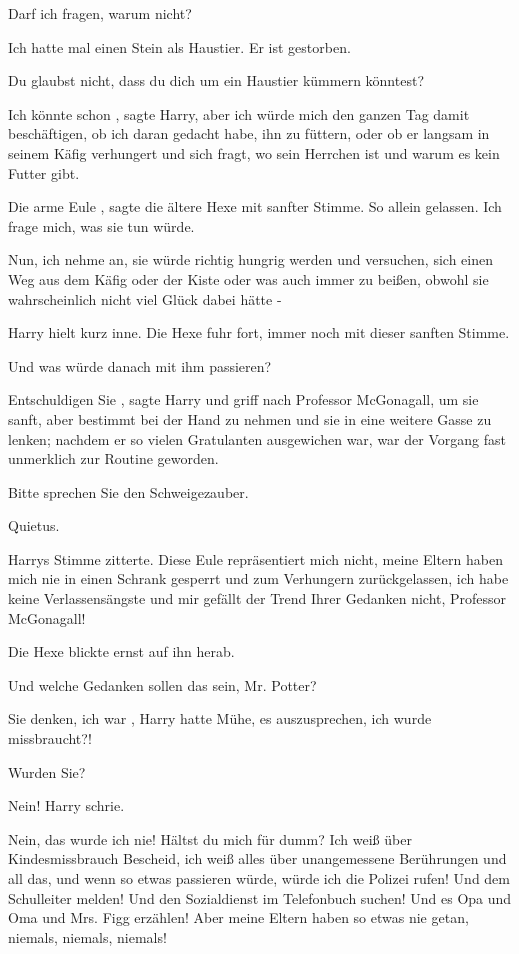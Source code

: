 \glqq Darf ich fragen, warum nicht?\grqq{}

\glqq Ich hatte mal einen Stein als Haustier. Er ist gestorben.\grqq{}

\glqq Du glaubst nicht, dass du dich um ein Haustier kümmern könntest?\grqq{}

\glqq Ich könnte schon\grqq{} , sagte Harry, \glqq aber ich würde mich den ganzen Tag
damit beschäftigen, ob ich daran gedacht habe, ihn zu füttern, oder ob er
langsam in seinem Käfig verhungert und sich fragt, wo sein Herrchen ist und
warum es kein Futter gibt.\grqq{}

\glqq Die arme Eule\grqq{} , sagte die ältere Hexe mit sanfter Stimme. \glqq So
allein gelassen. Ich frage mich, was sie tun würde.\grqq{}

\glqq Nun, ich nehme an, sie würde richtig hungrig werden und versuchen, sich
einen Weg aus dem Käfig oder der Kiste oder was auch immer zu beißen, obwohl
sie wahrscheinlich nicht viel Glück dabei hätte -\grqq{}

Harry hielt kurz inne. Die Hexe fuhr fort, immer noch mit dieser sanften Stimme.

\glqq Und was würde danach mit ihm passieren?\grqq{}

\glqq Entschuldigen Sie\grqq{} , sagte Harry und griff nach Professor
McGonagall, um sie sanft, aber bestimmt bei der Hand zu nehmen und sie in eine
weitere Gasse zu lenken; nachdem er so vielen Gratulanten ausgewichen war, war
der Vorgang fast unmerklich zur Routine geworden.

\glqq Bitte sprechen Sie den Schweigezauber.\grqq{}

\glqq Quietus.\grqq{}

Harrys Stimme zitterte. \glqq Diese Eule repräsentiert mich nicht, meine Eltern
haben mich nie in einen Schrank gesperrt und zum Verhungern zurückgelassen,
ich habe keine Verlassensängste und mir gefällt der Trend Ihrer Gedanken
nicht, Professor McGonagall!\grqq{}

Die Hexe blickte ernst auf ihn herab.

\glqq Und welche Gedanken sollen das sein, Mr. Potter?\grqq{}

\glqq Sie denken, ich war\grqq{} , Harry hatte Mühe, es auszusprechen, \glqq ich
wurde missbraucht?!\grqq{}

\glqq Wurden Sie?\grqq{}

\glqq Nein!\grqq{} Harry schrie.

\glqq Nein, das wurde ich nie! Hältst du mich für dumm? Ich weiß über
Kindesmissbrauch Bescheid, ich weiß alles über unangemessene Berührungen und
all das, und wenn so etwas passieren würde, würde ich die Polizei rufen! Und
dem Schulleiter melden! Und den Sozialdienst im Telefonbuch suchen! Und es
Opa und Oma und Mrs. Figg erzählen! Aber meine Eltern haben so etwas nie
getan, niemals, niemals, niemals!

